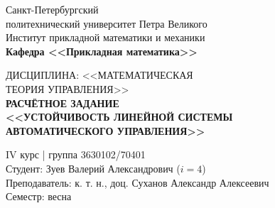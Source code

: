 \documentclass[zuev_lab1.tex]{subfiles}
\begin{document}
\begin{titlepage}
\begin{center}
	\begin{large}
		Санкт-Петербургский \\
        политехнический университет Петра Великого\\
		Институт прикладной математики и механики\\
		\textbf{Кафедра <<Прикладная математика>>}\\
	\end{large}
	\vfill
	\Large{
    ДИСЦИПЛИНА: <<МАТЕМАТИЧЕСКАЯ \\
    ТЕОРИЯ УПРАВЛЕНИЯ>> \\
    \textbf{
    РАСЧЁТНОЕ ЗАДАНИЕ  \\
	<<УСТОЙЧИВОСТЬ ЛИНЕЙНОЙ СИСТЕМЫ \\
    АВТОМАТИЧЕСКОГО УПРАВЛЕНИЯ>>
	}}
\end{center}
\vfill
\flushright
IV курс | группа 3630102/70401 \\
Студент: Зуев Валерий Александрович ($ i = 4 $)\\
Преподаватель: к. т. н., доц. Суханов Александр Алексеевич \\
Семестр: весна
\vfill
{}
\end{titlepage}
\end{document}
